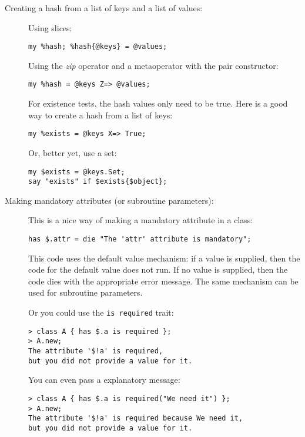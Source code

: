 \begin{description}
\item[Creating a hash from a list of keys and a list of values:] Using slices:

\begin{verbatim}
my %hash; %hash{@keys} = @values;
\end{verbatim}

Using the \emph{zip} operator and a metaoperator with the pair constructor:

\begin{verbatim}
my %hash = @keys Z=> @values;
\end{verbatim}

For existence tests, the hash values only need to be true. Here is 
a good way to create a hash from a list of keys:
\begin{verbatim}
my %exists = @keys X=> True;
\end{verbatim}

Or, better yet, use a set:
\begin{verbatim}
my $exists = @keys.Set;
say "exists" if $exists{$object};
\end{verbatim}

\item[Making mandatory attributes (or subroutine parameters):] 
This is a nice way of making a mandatory attribute in a class:
\begin{verbatim}
has $.attr = die "The 'attr' attribute is mandatory";
\end{verbatim}
This code uses the default value mechanism: if a value is supplied, 
then the code for the default value does not run. If no value is 
supplied, then the code dies with the appropriate error message. 
The same mechanism can be used for subroutine parameters.

Or you could use the \verb'is required' trait:

\begin{verbatim}
> class A { has $.a is required }; 
> A.new;
The attribute '$!a' is required, 
but you did not provide a value for it.
\end{verbatim}

You can even pass a explanatory message:

\begin{verbatim}
> class A { has $.a is required("We need it") }; 
> A.new;
The attribute '$!a' is required because We need it,
but you did not provide a value for it.
\end{verbatim}


\end{description}
